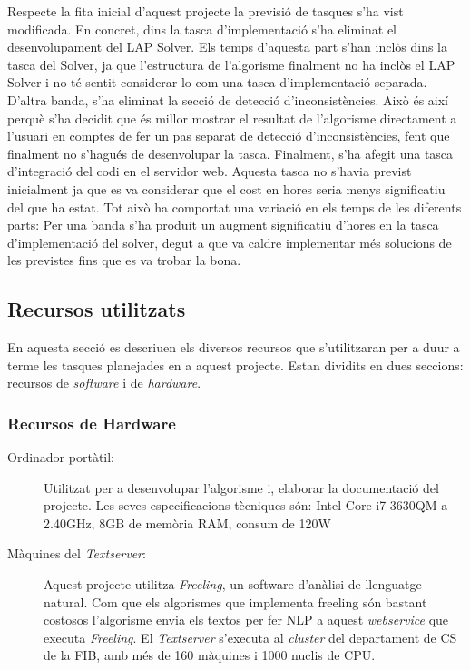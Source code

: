 Respecte la fita inicial d'aquest projecte la previsió de tasques s'ha vist modificada. En concret, dins la tasca d'implementació s'ha eliminat el desenvolupament del LAP Solver. Els temps d'aquesta part s'han inclòs dins la tasca del Solver, ja que l'estructura de l'algorisme finalment no ha inclòs el LAP Solver i no té sentit considerar-lo com una tasca d'implementació separada. D'altra banda, s'ha eliminat la secció de detecció d'inconsistències. Això és així perquè s'ha decidit que és millor mostrar el resultat de l'algorisme directament a l'usuari en comptes de fer un pas separat de detecció d'inconsistències, fent que finalment no s'hagués de desenvolupar la tasca. Finalment, s'ha afegit una tasca d'integració del codi en el servidor web. Aquesta tasca no s'havia previst inicialment ja que es va considerar que el cost en hores seria menys significatiu del que ha estat. Tot això ha comportat una variació en els temps de les diferents parts: Per una banda s'ha produit un augment significatiu d'hores en la tasca d'implementació del solver, degut a que va caldre implementar més solucions de les previstes fins que es va trobar la bona.


\subsection{Recursos utilitzats}
\label{sec:gestio-planificacio-recursos}

En aquesta secció es descriuen els diversos recursos que s'utilitzaran per a duur a terme les tasques planejades en a aquest projecte. Estan dividits en dues seccions: recursos de \emph{software} i de \emph{hardware}.

\subsubsection{Recursos de Hardware}

\begin{description}
    \item[Ordinador portàtil:] {Utilitzat per a desenvolupar l'algorisme i, elaborar la documentació del projecte. Les seves especificacions tècniques són: Intel Core i7-3630QM a 2.40GHz, 8GB de memòria RAM, consum de 120W}
    
    \item[Màquines del \emph{Textserver}:]{Aquest projecte utilitza \emph{Freeling}, un software d'anàlisi de llenguatge natural. Com que els algorismes que implementa freeling són bastant costosos l'algorisme envia els textos per fer NLP a aquest \emph{webservice} que executa \emph{Freeling}. El \emph{Textserver} s'executa al \emph{cluster} del departament de CS de la FIB, amb més de 160 màquines i 1000 nuclis de CPU.}
    
\end{description}


